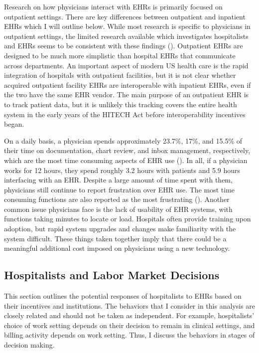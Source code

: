 \documentclass[12pt]{article}
\begin{document}
Research on how physicians interact with EHRs is primarily focused on outpatient settings. There are key differences between outpatient and inpatient EHRs which I will outline below. While most research is specific to physicians in outpatient settings, the limited research available which investigates hospitalists and EHRs seems to be consistent with these findings (\cite{tipping2010did}). Outpatient EHRs are designed to be much more simplistic than hospital EHRs that communicate across departments. An important aspect of modern US health care is the rapid integration of hospitals with outpatient facilities, but it is not clear whether acquired outpatient facility EHRs are interoperable with inpatient EHRs, even if the two have the same EHR vendor. The main purpose of an outpatient EHR is to track patient data, but it is unlikely this tracking covers the entire health system in the early years of the HITECH Act before interoperability incentives began.

On a daily basis, a physician spends approximately 23.7\%, 17\%, and 15.5\% of their time on documentation, chart review, and inbox management, respectively, which are the most time consuming aspects of EHR use (\cite{arndt2017tethered}). In all, if a physician works for 12 hours, they spend roughly 3.2 hours with patients and 5.9 hours interfacing with an EHR. Despite a large amount of time spent with them, physicians still continue to report frustration over EHR use. The most time consuming functions are also reported as the most frustrating (\cite{dymek2021building}). Another common issue physicians face is the lack of usability of EHR systems, with functions taking minutes to locate or load. Hospitals often provide training upon adoption, but rapid system upgrades and changes make familiarity with the system difficult. These things taken together imply that there could be a meaningful additional cost imposed on physicians using a new technology. 

\subsection{Hospitalists and Labor Market Decisions}

This section outlines the potential responses of hospitalists to EHRs based on their incentives and institutions. The behaviors that I consider in this analysis are closely related and should not be taken as independent. For example, hospitalists' choice of work setting depends on their decision to remain in clinical settings, and billing activity depends on work setting. Thus, I discuss the behaviors in stages of decision making. 
\end{document}
